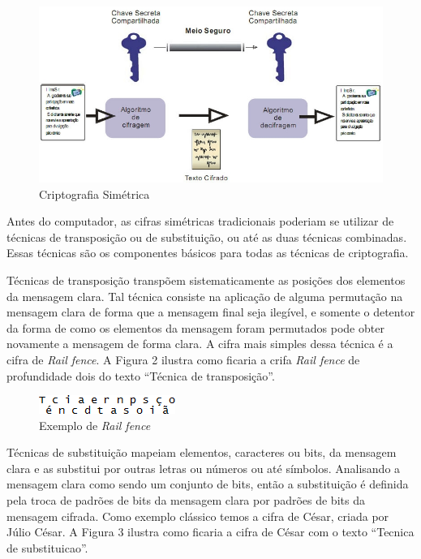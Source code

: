 \begin{figure}[H]
    \centering
    \caption{Criptografia Simétrica}
    \includegraphics[width=.8\linewidth]{Figuras/CripSimetrica.jpg}
\end{figure}

Antes do computador, as cifras simétricas tradicionais poderiam se utilizar de técnicas de transposição ou de substituição, ou até as duas técnicas combinadas. Essas técnicas são os componentes básicos para todas as técnicas de criptografia.

Técnicas de transposição transpõem sistematicamente as posições dos elementos da mensagem clara. Tal técnica consiste na aplicação de alguma permutação na mensagem clara de forma que a mensagem final seja ilegível, e somente o detentor da forma de como os elementos da mensagem foram permutados pode obter novamente a mensagem de forma clara. A cifra mais simples dessa técnica é a cifra de \textit{Rail fence}. A Figura 2 ilustra como ficaria a crifa \textit{Rail fence} de profundidade dois do texto “Técnica de transposição”.

\begin{figure}[H]
    \centering
    \caption{Exemplo de \textit{Rail fence}}
    \includegraphics{Figuras/RailFence.png}
\end{figure}

Técnicas de substituição mapeiam elementos, caracteres ou bits, da mensagem clara e as substitui por outras letras ou números ou até símbolos. Analisando a mensagem clara como sendo um conjunto de bits, então a substituição é definida pela troca de padrões de bits da mensagem clara por padrões de bits da mensagem cifrada. Como exemplo clássico temos a cifra de César, criada por Júlio César. A Figura 3 ilustra como ficaria a cifra de César com o texto “Tecnica de substituicao”.

